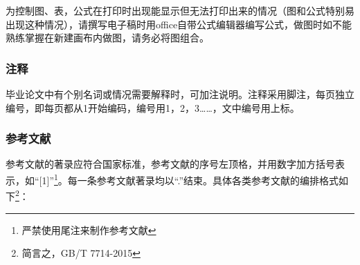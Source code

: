 为控制图、表，公式在打印时出现能显示但无法打印出来的情况（图和公式特别易出现这种情况），请撰写电子稿时用office自带公式编辑器编写公式，做图时如不能熟练掌握在新建画布内做图，请务必将图组合。

\subsubsection{注释}

毕业论文中有个别名词或情况需要解释时，可加注说明。注释采用脚注，每页独立编号，即每页都从1开始编码，编号用1，2，3……，文中编号用上标。

\subsubsection{参考文献}

参考文献的著录应符合国家标准，参考文献的序号左顶格，并用数字加方括号表示，如“[1]”\footnote{严禁使用尾注来制作参考文献}。每一条参考文献著录均以“.”结束。具体各类参考文献的编排格式如下\footnote{简言之，GB/T 7714-2015}：

